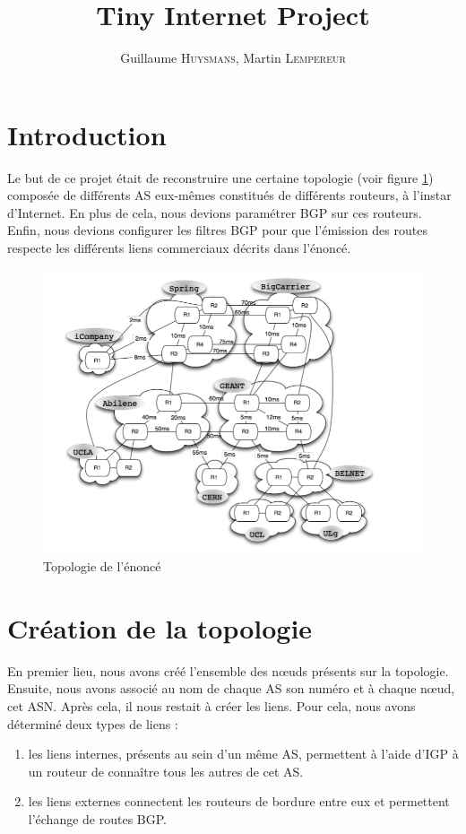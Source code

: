 \documentclass[10pt,a4paper,twocolumn]{article}
\title{Tiny Internet Project}
\author{Guillaume \textsc{Huysmans}, Martin \textsc{Lempereur}}
\begin{document}
\maketitle

\section{Introduction}
Le but de ce projet était de reconstruire une certaine topologie (voir figure \ref{fig:topo}) composée de différents AS eux-mêmes constitués de différents routeurs, à l'instar d'Internet. En plus de cela, nous devions paramétrer BGP sur ces routeurs. Enfin, nous devions configurer les filtres BGP pour que l'émission des routes respecte les différents liens commerciaux décrits dans l'énoncé.
\begin{figure}[h]
	\includegraphics[width=\columnwidth]{topo.png}
	\caption{Topologie de l'énoncé}
	\label{fig:topo}
\end{figure}

\section{Création de la topologie}
En premier lieu, nous avons créé l'ensemble des nœuds présents sur la topologie. Ensuite, nous avons associé au nom de chaque AS son numéro et à chaque nœud, cet ASN.
Après cela, il nous restait à créer les liens. Pour cela, nous avons déterminé deux types de liens :
\begin{enumerate}
	\item les liens internes, présents au sein d'un même AS, permettent à l'aide d'IGP à un routeur de connaître tous les autres de cet AS.
	\item les liens externes connectent les routeurs de bordure entre eux et permettent l'échange de routes BGP.
\end{enumerate}
\end{document}

